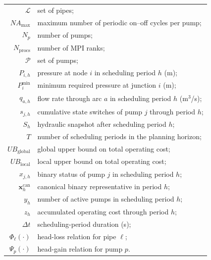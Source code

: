 \documentclass[Journal,letterpaper,InsideFigs]{ascelike-new}
\begin{document}
\begin{singlespace}
\begin{tabular}{r @{\hspace{1em}=\hspace{1em}} l}
		$\mathcal{L}$                 & set of pipes;                                                      \\
		$NA_{\max}$                   & maximum number of periodic on--off cycles per pump;                \\
		$N_p$                         & number of pumps;                                                   \\
		$N_{\mathrm{procs}}$          & number of MPI ranks;                                               \\
		$\mathcal{P}$                 & set of pumps;                                                      \\
		$P_{i,h}$                     & pressure at node $i$ in scheduling period $h$ (m);                 \\
		$P_i^{\min}$                  & minimum required pressure at junction $i$ (m);                     \\
		$q_{a,h}$                     & flow rate through arc $a$ in scheduling period $h$ (m$^3$/s);      \\
		$s_{j,h}$                     & cumulative state switches of pump $j$ through period $h$;          \\
		$S_h$                         & hydraulic snapshot after scheduling period $h$;                    \\
		$T$                           & number of scheduling periods in the planning horizon;              \\
		$UB_{\text{global}}$          & global upper bound on total operating cost;                        \\
		$UB_{\text{local}}$           & local upper bound on total operating cost;                         \\
		$x_{j,h}$                     & binary status of pump $j$ in scheduling period $h$;                \\
		$\mathbf{x}_h^{\mathrm{can}}$ & canonical binary representative in period $h$;                     \\
		$y_h$                         & number of active pumps in scheduling period $h$;                   \\
		$z_h$                         & accumulated operating cost through period $h$;                     \\
		$\Delta t$                    & scheduling-period duration (s);                                    \\
		$\Phi_\ell(\cdot)$            & head-loss relation for pipe $\ell$;                                \\
		$\Psi_p(\cdot)$               & head-gain relation for pump $p$.                                   \\
	\end{tabular}
\end{singlespace}


\end{document}
